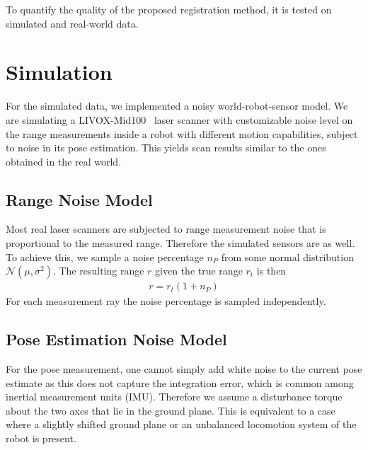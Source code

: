 To quantify the quality of the proposed registration method, it is tested on simulated and real-world data. 

\section{Simulation}

For the simulated data, we implemented a noisy world-robot-sensor model.  
We are simulating a LIVOX-Mid100~\cite{LivoxMid40-100} laser scanner with customizable noise level on the range measurements inside a robot with different motion capabilities, subject to noise in its pose estimation. This yields scan results similar to the ones obtained in the real world.

\subsection{Range Noise Model}

Most real laser scanners are subjected to range measurement noise that is proportional to the measured range. 
Therefore the simulated sensors are as well. 
To achieve this, we sample a noise percentage $n_P$ from some normal distribution $\mathcal{N}(\mu,\sigma^2)$. 
The resulting range $r$ given the true range $r_t$ is then
\begin{align}
	r = r_t(1+n_P)
\end{align}
For each measurement ray the noise percentage is sampled independently. 

\subsection{Pose Estimation Noise Model} 

For the pose measurement, one cannot simply add white noise to the current pose estimate as this does not capture the integration error, which is common among inertial measurement units (IMU). 
Therefore we assume a disturbance torque about the two axes that lie in the ground plane. 
This is equivalent to a case where a slightly shifted ground plane or an unbalanced locomotion system of the robot is present.  

